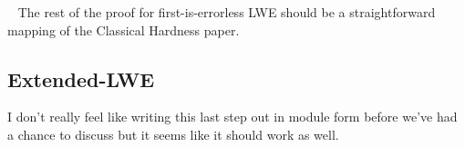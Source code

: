 \documentclass[oribibl,envcountsect,envcountsame]{llncs}
\begin{document}
~\cite{DBLP:conf/crypto/ApplebaumCPS09}
The rest of the proof for first-is-errorless LWE should be a straightforward mapping of the 
Classical Hardness paper.

\subsection{Extended-LWE}

I don't really feel like writing this last step out in module form before we've had a chance to discuss
but it seems like it should work as well. 










\end{document}
